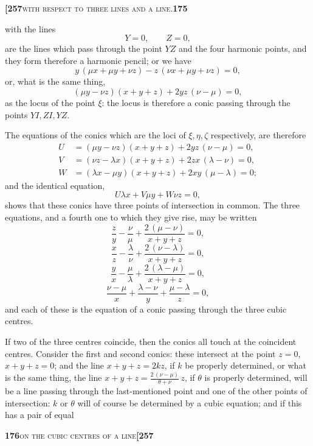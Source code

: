 \documentclass[11pt]{article}
\begin{document}
\newpage

\noindent\textbf{[257}\hfill\textsc{with respect to three lines and a line.}\hfill\textbf{175}

\medskip

\noindent with the lines
\[
Y = 0,\qquad Z = 0,
\]
are the lines which pass through the point $YZ$ and the four harmonic points, and they form therefore a harmonic pencil; or we have
\[
y\,(\mu x + \mu y + \nu z) - z\,(\nu x + \mu y + \nu z) = 0,
\]
or, what is the same thing,
\[
(\mu y - \nu z)(x + y + z) + 2yz\,(\nu - \mu) = 0,
\]
as the locus of the point $\xi$: the locus is therefore a conic passing through the points $YI, ZI, YZ$.

The equations of the conics which are the loci of $\xi, \eta, \zeta$ respectively, are therefore
\begin{align*}
U &= (\mu y - \nu z)(x + y + z) + 2yz\,(\nu - \mu) = 0,\\
V &= (\nu z - \lambda x)(x + y + z) + 2zx\,(\lambda - \nu) = 0,\\
W &= (\lambda x - \mu y)(x + y + z) + 2xy\,(\mu - \lambda) = 0;
\end{align*}
and the identical equation,
\[
U\lambda x + V\mu y + W\nu z = 0,
\]
shows that these conics have three points of intersection in common. The three equations, and a fourth one to which they give rise, may be written
\[
\frac{z}{y} - \frac{\nu}{\mu} + \frac{2\,(\mu - \nu)}{x + y + z} = 0,
\]
\[
\frac{x}{z} - \frac{\lambda}{\nu} + \frac{2\,(\nu - \lambda)}{x + y + z} = 0,
\]
\[
\frac{y}{x} - \frac{\mu}{\lambda} + \frac{2\,(\lambda - \mu)}{x + y + z} = 0,
\]
\[
\frac{\nu - \mu}{x} + \frac{\lambda - \nu}{y} + \frac{\mu - \lambda}{z} = 0,
\]
and each of these is the equation of a conic passing through the three cubic centres.

If two of the three centres coincide, then the conics all touch at the coincident centres. Consider the first and second conics: these intersect at the point $z = 0$, $x + y + z = 0$; and the line $x + y + z = 2kz$, if $k$ be properly determined, or what is the same thing, the line $x + y + z = \tfrac{2\,(\nu - \mu)}{\theta + \nu}\,z$, if $\theta$ is properly determined, will be a line passing through the last-mentioned point and one of the other points of intersection: $k$ or $\theta$ will of course be determined by a cubic equation; and if this has a pair of equal

\newpage

\noindent\textbf{176}\hfill\textsc{on the cubic centres of a line}\hfill\textbf{[257}
\end{document}
